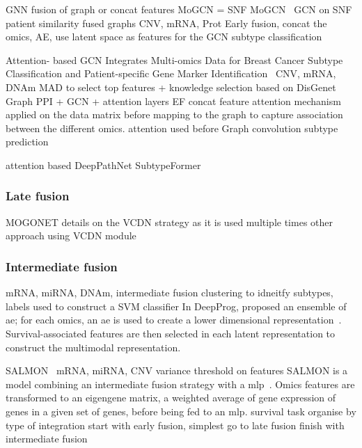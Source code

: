 \documentclass[../main.tex]{subfiles}
\begin{document}
		GNN fusion of graph or concat features
		MoGCN = SNF
		MoGCN~\cite{MoGCN} GCN on SNF patient similarity fused graphs
		CNV, mRNA, Prot
		Early fusion, concat the omics, AE, use latent space as features for the GCN subtype classification
		
		Attention- based GCN Integrates Multi-omics Data for Breast Cancer Subtype Classification and Patient-specific Gene Marker Identification~\cite{Guo2023}
		CNV, mRNA, DNAm
		MAD to select top features + knowledge selection based on DisGenet
		Graph PPI + GCN + attention layers
		EF concat feature
		attention mechanism applied on the data matrix before mapping to the graph to capture association between the different omics. 
		attention used before Graph convolution
		subtype prediction

		attention based 
		DeepPathNet
		SubtypeFormer
		
		
		
		

		\subsubsection{Late fusion}
		MOGONET details on the VCDN strategy as it is used multiple times 
		other approach using VCDN module 
		\subsubsection{Intermediate fusion}
		\cite{DeepProg} mRNA, miRNA, DNAm, intermediate fusion
		clustering to idneitfy subtypes, labels used to construct a SVM classifier
		In DeepProg, \citeauthor{DeepProg} proposed an ensemble of \gls{ae}; for each omics, an \gls{ae} is used to create a lower dimensional representation~\cite{DeepProg}.
		Survival-associated features are then selected in each latent representation to construct the multimodal representation.

		SALMON~\cite{SALMON} mRNA, miRNA, CNV
		variance threshold on features
		SALMON is a model combining an intermediate fusion strategy with a \gls{mlp}~\cite{SALMON}.
		Omics features are transformed to an eigengene matrix, a weighted average of gene expression of genes in a given set of genes, before being fed to an \gls{mlp}.
		survival task
			organise by type of integration
			start with early fusion, simplest
			go to late fusion
			finish with intermediate fusion

			\ifSubfilesClassLoaded{%
	}{
	}
			
\end{document}
